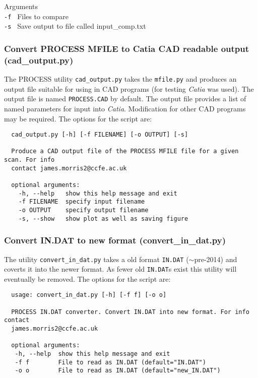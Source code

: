 \documentclass[11pt,a4paper]{article}
\begin{document}
Arguments\\
\texttt{-f        }     Files to compare\\
\texttt{-s        }     Save output to file called input\_comp.txt\\


\subsubsection{Convert PROCESS MFILE to Catia CAD readable output (cad\_output.py)}

The PROCESS utility \texttt{cad\_output.py} takes the \texttt{mfile.py} and produces an 
output file suitable for using in CAD programs (for testing \emph{Catia} was used). The output 
file is named \texttt{PROCESS.CAD} by default. The output file provides a list of named 
parameters for input into \emph{Catia}. Modification for other CAD programs may be required. 
The options for the script are:\\

\begin{mdframed}
 \begin{verbatim}
  cad_output.py [-h] [-f FILENAME] [-o OUTPUT] [-s]

  Produce a CAD output file of the PROCESS MFILE file for a given scan. For info
  contact james.morris2@ccfe.ac.uk
  
  optional arguments:
    -h, --help   show this help message and exit
    -f FILENAME  specify input filename
    -o OUTPUT    specify output filename
    -s, --show   show plot as well as saving figure
 \end{verbatim}
\end{mdframed}

\subsubsection{Convert IN.DAT to new format (convert\_in\_dat.py)}

The utility \texttt{convert\_in\_dat.py} takes a old format \texttt{IN.DAT} ($\sim$pre-2014) 
and coverts it into the newer format. As fewer old \texttt{IN.DAT}s exist this utility will 
eventually be removed. The options for the script are:\\

\begin{mdframed}
 \begin{verbatim}
  usage: convert_in_dat.py [-h] [-f f] [-o o]

  PROCESS IN.DAT converter. Convert IN.DAT into new format. For info contact
  james.morris2@ccfe.ac.uk

  optional arguments:
   -h, --help  show this help message and exit
   -f f        File to read as IN.DAT (default="IN.DAT")
   -o o        File to read as IN.DAT (default="new_IN.DAT")
 \end{verbatim}
\end{mdframed}
\end{document}
